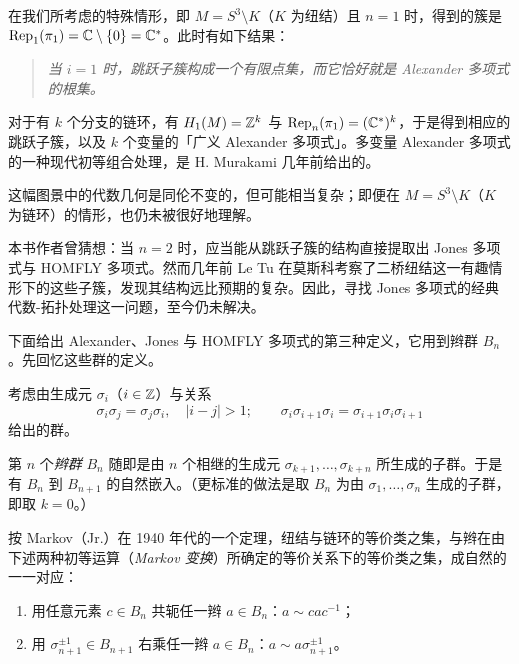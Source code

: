 
在我们所考虑的特殊情形，即 $M=S^3\setminus K$（$K$ 为纽结）且 $n=1$ 时，得到的簇是 $\mathrm{Rep}_1(\pi_1)=\mathbb{C}\setminus\{0\}=\mathbb{C}^*$。此时有如下结果：

\begin{quote}
\itshape
当 $i=1$ 时，跳跃子簇构成一个有限点集，而它恰好就是 Alexander 多项式的根集。
\end{quote}


对于有 $k$ 个分支的链环，有 $H_1(M)=\mathbb{Z}^k$ 与 $\mathrm{Rep}_n(\pi_1)=(\mathbb{C}^*)^k$，于是得到相应的跳跃子簇，以及 $k$ 个变量的「广义 Alexander 多项式」。多变量 Alexander 多项式的一种现代初等组合处理，是 H. Murakami 几年前给出的。

这幅图景中的代数几何是同伦不变的，但可能相当复杂；即便在 $M=S^3\setminus K$（$K$ 为链环）的情形，也仍未被很好地理解。

本书作者曾猜想：当 $n=2$ 时，应当能从跳跃子簇的结构直接提取出 Jones 多项式与 HOMFLY 多项式。然而几年前 Le Tu 在莫斯科考察了二桥纽结这一有趣情形下的这些子簇，发现其结构远比预期的复杂。因此，寻找 Jones 多项式的经典代数-拓扑处理这一问题，至今仍未解决。

下面给出 Alexander、Jones 与 HOMFLY 多项式的第三种定义，它用到辫群 $B_n$。先回忆这些群的定义。

考虑由生成元 $\sigma_i$（$i\in\mathbb{Z}$）与关系
\[
\sigma_i\sigma_j=\sigma_j\sigma_i,\quad |i-j|>1;\qquad
\sigma_i\sigma_{i+1}\sigma_i=\sigma_{i+1}\sigma_i\sigma_{i+1}
\]
给出的群。

第 $n$ 个\emph{辫群} $B_n$ 随即是由 $n$ 个相继的生成元 $\sigma_{k+1},\dots,\sigma_{k+n}$ 所生成的子群。于是有 $B_n$ 到 $B_{n+1}$ 的自然嵌入。（更标准的做法是取 $B_n$ 为由 $\sigma_1,\dots,\sigma_n$ 生成的子群，即取 $k=0$。）

按 Markov（Jr.）在 1940 年代的一个定理，纽结与链环的等价类之集，与辫在由下述两种初等运算（\emph{Markov 变换}）所确定的等价关系下的等价类之集，成自然的一一对应：

\begin{enumerate}
\item 用任意元素 $c\in B_n$ 共轭任一辫 $a\in B_n$：$a\sim cac^{-1}$；
\item 用 $\sigma_{n+1}^{\pm 1}\in B_{n+1}$ 右乘任一辫 $a\in B_n$：$a\sim a\sigma_{n+1}^{\pm 1}$。
\end{enumerate}

